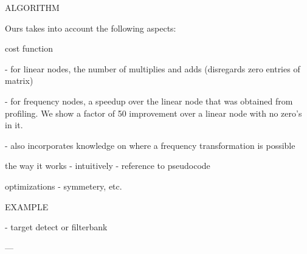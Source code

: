 ALGORITHM

Ours takes into account the following aspects:

cost function

  - for linear nodes, the number of multiplies and adds (disregards
    zero entries of matrix)

  - for frequency nodes, a speedup over the linear node that was
    obtained from profiling.  We show a factor of 50 improvement over
    a linear node with no zero's in it.

      - also incorporates knowledge on where a frequency
        transformation is possible

the way it works
  - intuitively
  - reference to pseudocode

optimizations
  - symmetery, etc.

EXAMPLE

- target detect or filterbank

---

